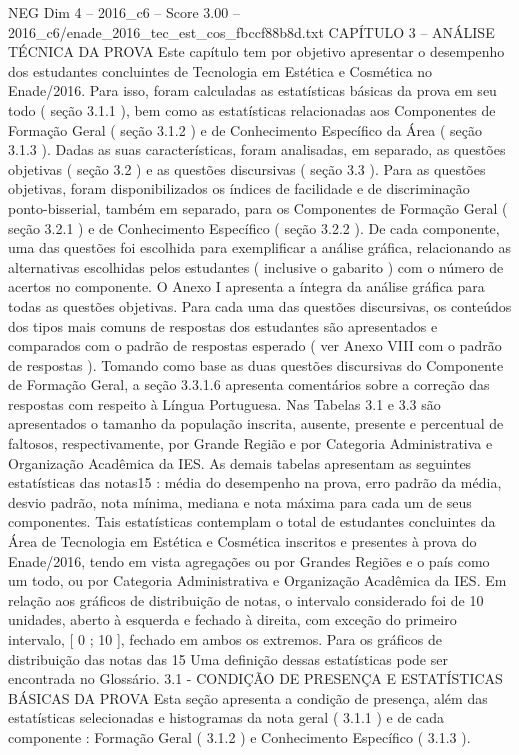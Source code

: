 \begin{textsample}{NEG Dim 4 – 2016\_c6 – Score 3.00 – 2016\_c6/enade\_2016\_tec\_est\_cos\_fbccf88b8d.txt}  \label{ex:f4_neg_308}
CAPÍTULO 3 – ANÁLISE TÉCNICA DA PROVA Este capítulo tem por objetivo apresentar o desempenho dos estudantes concluintes de Tecnologia em Estética e Cosmética no Enade/2016.
Para isso, foram calculadas as estatísticas básicas da prova em seu todo ( seção 3.1.1 ), bem como as estatísticas relacionadas aos Componentes de Formação Geral ( seção 3.1.2 ) e de Conhecimento Específico da Área ( seção 3.1.3 ).
Dadas as suas características, foram analisadas, em separado, as questões objetivas ( seção 3.2 ) e as questões discursivas ( seção 3.3 ).
Para as questões objetivas, foram disponibilizados os índices de facilidade e de discriminação ponto-bisserial, também em separado, para os Componentes de Formação Geral ( seção 3.2.1 ) e de Conhecimento Específico ( seção 3.2.2 ).
De cada componente, uma das questões foi escolhida para exemplificar a análise gráfica, relacionando as alternativas escolhidas pelos estudantes ( inclusive o gabarito ) com o número de acertos no componente.
O Anexo I apresenta a íntegra da análise gráfica para todas as questões objetivas.
Para cada uma das questões discursivas, os conteúdos dos tipos mais comuns de respostas dos estudantes são apresentados e comparados com o padrão de respostas esperado ( ver Anexo VIII com o padrão de respostas ).
Tomando como base as duas questões discursivas do Componente de Formação Geral, a seção 3.3.1.6 apresenta comentários sobre a correção das respostas com respeito à Língua Portuguesa.
Nas Tabelas 3.1 e 3.3 são apresentados o tamanho da população inscrita, ausente, presente e percentual de faltosos, respectivamente, por Grande Região e por Categoria Administrativa e Organização Acadêmica da IES.
As demais tabelas apresentam as seguintes estatísticas das notas15 : média do desempenho na prova, erro padrão da média, desvio padrão, nota mínima, mediana e nota máxima para cada um de seus componentes.
Tais estatísticas contemplam o total de estudantes concluintes da Área de Tecnologia em Estética e Cosmética inscritos e presentes à prova do Enade/2016, tendo em vista agregações ou por Grandes Regiões e o país como um todo, ou por Categoria Administrativa e Organização Acadêmica da IES.
Em relação aos gráficos de distribuição de notas, o intervalo considerado foi de 10 unidades, aberto à esquerda e fechado à direita, com exceção do primeiro intervalo, [ 0 ; 10 ], fechado em ambos os extremos.
Para os gráficos de distribuição das notas das 15 Uma definição dessas estatísticas pode ser encontrada no Glossário. 3.1 - CONDIÇÃO DE PRESENÇA E ESTATÍSTICAS BÁSICAS DA PROVA Esta seção apresenta a condição de presença, além das estatísticas selecionadas e histogramas da nota geral ( 3.1.1 ) e de cada componente : Formação Geral ( 3.1.2 ) e Conhecimento Específico ( 3.1.3 ).

\end{textsample}
